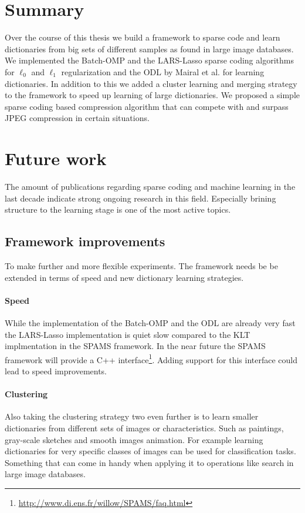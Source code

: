 \section{Summary}
Over the course of this thesis we build a framework to sparse code and learn
dictionaries from big sets of different samples as found in large image
databases. We implemented the Batch-OMP and the LARS-Lasso sparse coding
algorithms for $\ell_0$ and $\ell_1$ regularization and the ODL by Mairal et
al. for learning dictionaries. 
In addition to this we added a cluster learning and merging strategy to the
framework to speed up learning of large dictionaries.
We proposed a simple sparse coding based compression algorithm that can compete
with and surpass JPEG compression in certain situations.


\section{Future work}
The amount of publications regarding sparse coding and machine learning in the
last decade indicate strong ongoing research in this field. Especially
brining structure to the learning stage is one of the most active topics.

\subsection{Framework improvements}
To make further and more flexible experiments. The framework needs be be
extended in terms of speed and new dictionary learning strategies.

\paragraph{Speed}
While the implementation of the Batch-OMP and the ODL are already very fast
the LARS-Lasso implementation is quiet slow compared to the KLT implmentation in
the SPAMS framework. In the near future the SPAMS framework will provide a C++
interface\footnote{\url{http://www.di.ens.fr/willow/SPAMS/faq.html}}. Adding
support for this interface could lead to speed improvements.

\paragraph{Clustering}
Also taking the clustering strategy two even further is to learn smaller
dictionaries from different sets of images or characteristics. Such as
paintings, gray-scale sketches and smooth images animation. For example learning
dictionaries for very specific classes of images can be used for classification
tasks. Something that can come in handy when applying it to operations like
search in large image databases.

